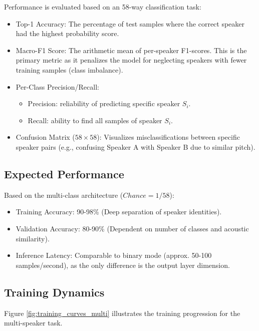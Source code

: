 \documentclass[12pt,a4paper]{article}
\newcommand{\numSpeakers}{58}
\newcommand{\interferenceSpeed}{50-100 samples/second}
\begin{document}
Performance is evaluated based on an \numSpeakers{}-way classification task:
\begin{itemize}
    \item Top-1 Accuracy: The percentage of test samples where the correct speaker had the highest probability score.
    \item Macro-F1 Score: The arithmetic mean of per-speaker F1-scores. This is the primary metric as it penalizes the model for neglecting speakers with fewer training samples (class imbalance).
    \item Per-Class Precision/Recall:
    \begin{itemize}
        \item Precision: reliability of predicting specific speaker $S_i$.
        \item Recall: ability to find all samples of speaker $S_i$.
    \end{itemize}
    \item Confusion Matrix ($\numSpeakers{} \times \numSpeakers{}$): Visualizes misclassifications between specific speaker pairs (e.g., confusing Speaker A with Speaker B due to similar pitch).
\end{itemize}

\subsection{Expected Performance}

Based on the multi-class architecture ($Chance = 1/\numSpeakers{}$):
\begin{itemize}
    \item Training Accuracy: 90-98\% (Deep separation of speaker identities).
    \item Validation Accuracy: 80-90\% (Dependent on number of classes and acoustic similarity).
    \item Inference Latency: Comparable to binary mode (approx. \interferenceSpeed{}), as the only difference is the output layer dimension.
\end{itemize}

\subsection{Training Dynamics}

Figure \ref{fig:training_curves_multi} illustrates the training progression for the multi-speaker task.
\end{document}
